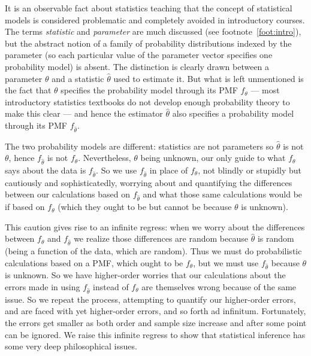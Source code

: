 \documentclass[11pt]{article}
\begin{document}
It is an observable fact about statistics teaching that the concept
of statistical models is considered problematic and completely avoided
in introductory courses.  The terms \emph{statistic} and \emph{parameter}
are much discussed (see footnote~\ref{foot:intro}),
but the abstract notion of a family of probability
distributions indexed by the parameter (so each particular value of the
parameter vector specifies one probability model) is absent.  The distinction
is clearly drawn between a parameter $\theta$ and a statistic $\hat{\theta}$
used to estimate it.  But what is left unmentioned is the fact that $\theta$
specifies the probability model through its PMF $f_\theta$ ---
most introductory statistics textbooks do not develop enough probability
theory to make this clear --- and hence the estimator $\hat{\theta}$ also
specifies a probability model through its PMF $f_{\hat{\theta}}$.

The two probability models are different: statistics are not parameters
so $\hat{\theta}$
is not $\theta$, hence $f_{\hat{\theta}}$ is not $f_\theta$.  Nevertheless,
$\theta$ being unknown, our only guide to what $f_\theta$ says about the data
is $f_{\hat{\theta}}$.  So we use $f_{\hat{\theta}}$ in place of $f_\theta$,
not blindly or stupidly but cautiously and sophisticatedly, worrying about
and quantifying the differences between our calculations based
on $f_{\hat{\theta}}$ and what those same calculations would be if based on
$f_\theta$ (which they ought to be but cannot be because $\theta$ is unknown).

This caution gives rise to an infinite regress: when we worry
about the differences between $f_\theta$ and $f_{\hat{\theta}}$ we realize
those differences are random because $\hat{\theta}$ is random (being a function
of the data, which are random).  Thus we must do probabilistic calculations
based on a PMF, which ought to be $f_\theta$, but we must
use $f_{\hat{\theta}}$ because $\theta$ is unknown.
So we have higher-order worries that our calculations about the
errors made in using $f_{\hat{\theta}}$ instead of $f_\theta$ are themselves
wrong because of the same issue.  So we repeat the process, attempting to
quantify our higher-order errors, and are faced with yet higher-order errors,
and so forth ad infinitum.  Fortunately, the errors get smaller as both order
and sample size
increase and after some point can be ignored.  We raise this infinite regress
to show that statistical inference has some very deep philosophical issues.
\end{document}
